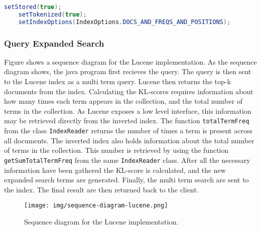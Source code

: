 \begin{lstlisting}[language=java, caption={Lucene's \texttt{TextField} index configuration.}, label={lst:lucene-text-field}]
    setStored(true);
    setTokenized(true);
    setIndexOptions(IndexOptions.DOCS_AND_FREQS_AND_POSITIONS);
\end{lstlisting}

\subsubsection{Query Expanded Search}
Figure shows a sequence diagram for the Lucene implementation.
As the sequence diagram shows, the java program first recieves the query.
The query is then sent to the Lucene index as a multi term query.
Lucene then returns the top-k documents from the index.
Calculating the KL-scores requires information about how many times each term appears in the collection,
and the total number of terms in the collection.
As Lucene exposes a low level interface,
this information may be retrieved directly from the inverted index.
The function \texttt{totalTermFreq} from the class \texttt{IndexReader} returns the number of times a term is present across all documents.
The inverted index also holds information about the total number of terms in the collection.
This number is retrieved by using the function \texttt{getSumTotalTermFreq} from the same \texttt{IndexReader} class.
After all the necessary information have been gathered the KL-score is calculated,
and the new expanded search terms are generated.
Finally, the multi term search are sent to the index.
The final result are then returned back to the client.

\begin{figure}[h!]
  \centering \texttt{[image: img/sequence-diagram-lucene.png]}
  \caption{Sequence diagram for the Lucene implementation.}
  \label{fig:sequence-diagram-lucene}
\end{figure}
